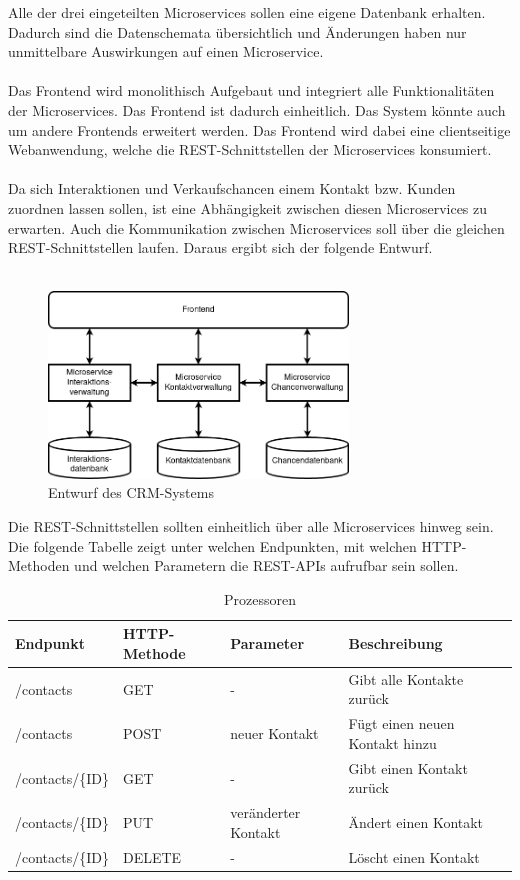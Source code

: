 Alle der drei eingeteilten Microservices sollen eine eigene Datenbank erhalten. Dadurch sind die Datenschemata übersichtlich und Änderungen haben nur unmittelbare Auswirkungen auf einen Microservice. \\
\\
Das Frontend wird monolithisch Aufgebaut und integriert alle Funktionalitäten der Microservices. Das Frontend ist dadurch einheitlich. Das System könnte auch um andere Frontends erweitert werden. Das Frontend wird dabei eine clientseitige Webanwendung, welche die REST-Schnittstellen der Microservices konsumiert. \\
\\
Da sich Interaktionen und Verkaufschancen einem Kontakt bzw. Kunden zuordnen lassen sollen, ist eine Abhängigkeit zwischen diesen Microservices zu erwarten. Auch die Kommunikation zwischen Microservices soll über die gleichen REST-Schnittstellen laufen. Daraus ergibt sich der folgende Entwurf. \\
\\
\begin{figure}[H] 
    \centering
    \includegraphics[width=0.71\textwidth]{figures/CRMEntwurf.png}
    \caption{Entwurf des \acp{CRM-System}}
    \label{fig:CRMENTWURF}
\end{figure}

Die REST-Schnittstellen sollten einheitlich über alle Microservices hinweg sein. Die folgende Tabelle zeigt unter welchen Endpunkten, mit welchen HTTP-Methoden und welchen Parametern die REST-APIs aufrufbar sein sollen.

\begin{table}[H]
\centering
    \begin{tabular}[H]{l|l|l|l}
        Endpunkt & HTTP-Methode & Parameter & Beschreibung \\
        \hline
        /contacts & GET & - & Gibt alle Kontakte zurück \\
        \hline
        /contacts & POST & neuer Kontakt & Fügt einen neuen Kontakt hinzu \\
        \hline
        /contacts/\{ID\} & GET & - & Gibt einen Kontakt zurück \\
        \hline
        /contacts/\{ID\} & PUT & veränderter Kontakt & Ändert einen Kontakt \\
        \hline
        /contacts/\{ID\} & DELETE & - & Löscht einen Kontakt \\
        \hline
    \end{tabular}
    \caption{Prozessoren}
\end{table}

